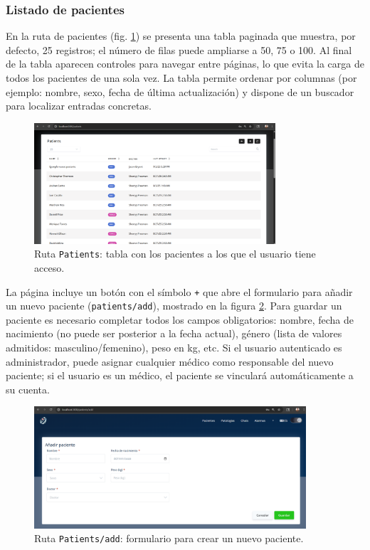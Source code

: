 \documentclass[12pt, a4paper]{article}
\begin{document}
\begin{umaappendices}
	\subsubsection{Listado de pacientes}
	En la ruta de pacientes (fig. \ref{fig:list}) se presenta una tabla paginada que muestra, por defecto, 25 registros; el número de filas puede ampliarse a 50, 75 o 100. Al final de la tabla aparecen controles para navegar entre páginas, lo que evita la carga de todos los pacientes de una sola vez. La tabla permite ordenar por columnas (por ejemplo: nombre, sexo, fecha de última actualización) y dispone de un buscador para localizar entradas concretas.
	
	\begin{figure}[htbp]
		\centering
		\includegraphics[width=0.8\textwidth]{images/4_pacientes.png}
		\caption[Ejemplo]{Ruta \texttt{Patients}: tabla con los pacientes a los que el usuario tiene acceso.}
		\label{fig:list}
	\end{figure}
	
	La página incluye un botón con el símbolo \texttt{+} que abre el formulario para añadir un nuevo paciente (\texttt{patients/add}), mostrado en la figura \ref{fig:add}. Para guardar un paciente es necesario completar todos los campos obligatorios: nombre, fecha de nacimiento (no puede ser posterior a la fecha actual), género (lista de valores admitidos: masculino/femenino), peso en kg, etc. Si el usuario autenticado es administrador, puede asignar cualquier médico como responsable del nuevo paciente; si el usuario es un médico, el paciente se vinculará automáticamente a su cuenta.
	

	
	\begin{figure}[htbp]
		\centering
		\includegraphics[width=0.9\textwidth]{images/5_patientadd.png}
		\caption[Ejemplo]{Ruta \texttt{Patients/add}: formulario para crear un nuevo paciente.}
		\label{fig:add}
	\end{figure}


\end{umaappendices}
\end{document}
